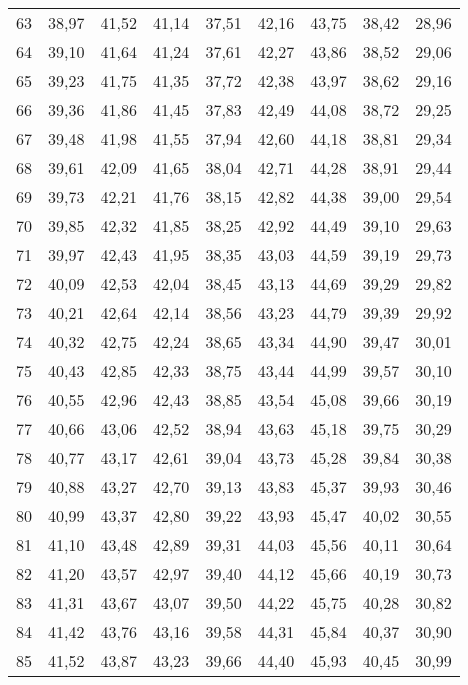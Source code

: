 \begin{longtable}{c c c c c c c c c}
      63	& 38,97	& 41,52	& 41,14	& 37,51	& 42,16	& 43,75	& 38,42	& 28,96 \\
      64	& 39,10	& 41,64	& 41,24	& 37,61	& 42,27	& 43,86	& 38,52	& 29,06 \\
      65	& 39,23	& 41,75	& 41,35	& 37,72	& 42,38	& 43,97	& 38,62	& 29,16 \\
      66	& 39,36	& 41,86	& 41,45	& 37,83	& 42,49	& 44,08	& 38,72	& 29,25 \\
      67	& 39,48	& 41,98	& 41,55	& 37,94	& 42,60	& 44,18	& 38,81	& 29,34 \\
      68	& 39,61	& 42,09	& 41,65	& 38,04	& 42,71	& 44,28	& 38,91	& 29,44 \\
      69	& 39,73	& 42,21	& 41,76	& 38,15	& 42,82	& 44,38	& 39,00	& 29,54 \\
      70	& 39,85	& 42,32	& 41,85	& 38,25	& 42,92	& 44,49	& 39,10	& 29,63 \\
      71	& 39,97	& 42,43	& 41,95	& 38,35	& 43,03	& 44,59	& 39,19	& 29,73 \\
      72	& 40,09	& 42,53	& 42,04	& 38,45	& 43,13	& 44,69	& 39,29	& 29,82 \\
      73	& 40,21	& 42,64	& 42,14	& 38,56	& 43,23	& 44,79	& 39,39	& 29,92 \\
      74	& 40,32	& 42,75	& 42,24	& 38,65	& 43,34	& 44,90	& 39,47	& 30,01 \\
      75	& 40,43	& 42,85	& 42,33	& 38,75	& 43,44	& 44,99	& 39,57	& 30,10 \\
      76	& 40,55	& 42,96	& 42,43	& 38,85	& 43,54	& 45,08	& 39,66	& 30,19 \\
      77	& 40,66	& 43,06	& 42,52	& 38,94	& 43,63	& 45,18	& 39,75	& 30,29 \\
      78	& 40,77	& 43,17	& 42,61	& 39,04	& 43,73	& 45,28	& 39,84	& 30,38 \\
      79	& 40,88	& 43,27	& 42,70	& 39,13	& 43,83	& 45,37	& 39,93	& 30,46 \\
      80	& 40,99	& 43,37	& 42,80	& 39,22	& 43,93	& 45,47	& 40,02	& 30,55 \\
      81	& 41,10	& 43,48	& 42,89	& 39,31	& 44,03	& 45,56	& 40,11	& 30,64 \\
      82	& 41,20	& 43,57	& 42,97	& 39,40	& 44,12	& 45,66	& 40,19	& 30,73 \\
      83	& 41,31	& 43,67	& 43,07	& 39,50	& 44,22	& 45,75	& 40,28	& 30,82 \\
      84	& 41,42	& 43,76	& 43,16	& 39,58	& 44,31	& 45,84	& 40,37	& 30,90 \\
      85	& 41,52	& 43,87	& 43,23	& 39,66	& 44,40	& 45,93	& 40,45	& 30,99 \\

\end{longtable}
